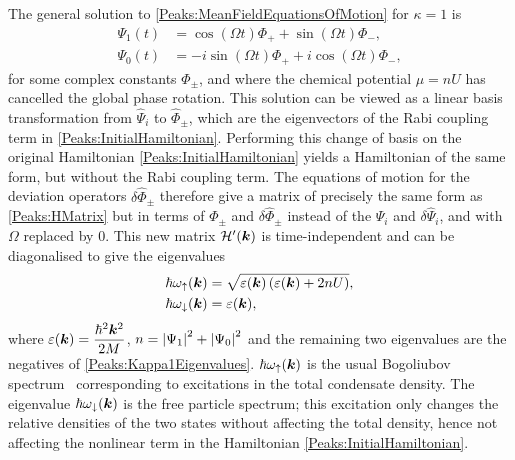 The general solution to \eqref{Peaks:MeanFieldEquationsOfMotion} for $\kappa = 1$ is
\begin{subequations}
    \label{Peaks:Kappa1MeanFieldSolution}
    \begin{align}
        \Psi_1(t) &= \cos(\Omega t) \Phi_+ + \sin(\Omega t) \Phi_-, \\
        \Psi_0(t) &= -i\sin(\Omega t) \Phi_+ + i\cos(\Omega t) \Phi_-,
    \end{align}
\end{subequations}
for some complex constants $\Phi_\pm$, and where the chemical potential $\mu = n U$ has cancelled the global phase rotation. This solution can be viewed as a linear basis transformation from $\hat{\Psi}_i$ to $\hat{\Phi}_\pm$, which are the eigenvectors of the Rabi coupling term in \eqref{Peaks:InitialHamiltonian}. Performing this change of basis on the original Hamiltonian \eqref{Peaks:InitialHamiltonian} yields a Hamiltonian of the same form, but without the Rabi coupling term. The equations of motion for the deviation operators $\delta\hat{\Phi}_\pm$ therefore give a matrix of precisely the same form as \eqref{Peaks:HMatrix} but in terms of $\Phi_\pm$ and $\delta\hat{\Phi}_\pm$ instead of the $\Psi_i$ and $\delta\hat{\Psi}_i$, and with $\Omega$ replaced by 0. This new matrix $\mathcal{H}'(\bm{k})$ is time-independent and can be diagonalised to give the eigenvalues
\begin{subequations}
    \label{Peaks:Kappa1Eigenvalues}
    \begin{align}
        \hbar \omega_\uparrow(\vect{k}) &= \sqrt{\varepsilon(\vect{k})\left(\varepsilon(\vect{k}) + 2 n U\right)},\\
        \hbar \omega_\downarrow(\vect{k}) &= \varepsilon(\vect{k}),
    \end{align}
\end{subequations}
where $\displaystyle\varepsilon(\bm{k}) = \frac{\hbar^2\bm{k}^2}{2M}$, $n= \left|\Psi_1\right|^2 + \left|\Psi_0\right|^2$ and the remaining two eigenvalues are the negatives of \eqref{Peaks:Kappa1Eigenvalues}. $\hbar \omega_\uparrow(\bm{k})$ is the usual Bogoliubov spectrum~\citep{Bogoliubov:1947} corresponding to excitations in the total condensate density. The eigenvalue $\hbar \omega_\downarrow(\bm{k})$ is the free particle spectrum; this excitation only changes the relative densities of the two states without affecting the total density, hence not affecting the nonlinear term in the Hamiltonian \eqref{Peaks:InitialHamiltonian}.

